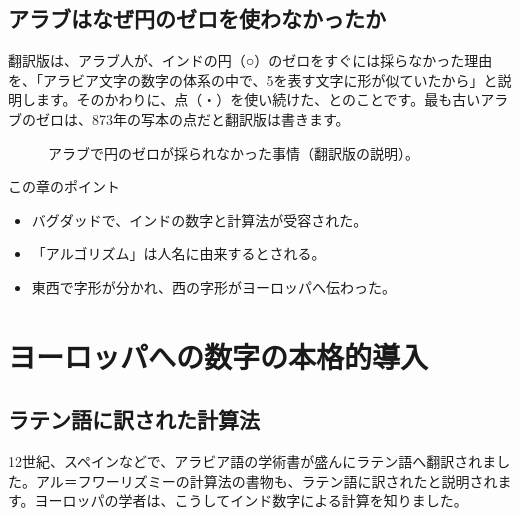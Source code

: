 \documentclass[a4paper,11pt,openany]{ltjsbook}
\begin{document}
\section{アラブはなぜ円のゼロを使わなかったか}

翻訳版は、アラブ人が、インドの円（○）のゼロをすぐには採らなかった理由を、「アラビア文字の数字の体系の中で、5を表す文字に形が似ていたから」と説明します。そのかわりに、点（・）を使い続けた、とのことです。最も古いアラブのゼロは、873年の写本の点だと翻訳版は書きます。

\begin{figure}[htbp]
\centering
{}
\caption{アラブで円のゼロが採られなかった事情（翻訳版の説明）。}
\end{figure}

\begin{pointbox}{この章のポイント}
\begin{itemize}[leftmargin=1.5em]
\item バグダッドで、インドの数字と計算法が受容された。
\item 「アルゴリズム」は人名に由来するとされる。
\item 東西で字形が分かれ、西の字形がヨーロッパへ伝わった。
\end{itemize}
\end{pointbox}

\chapter{ヨーロッパへの数字の本格的導入}

\section{ラテン語に訳された計算法}

12世紀、スペインなどで、アラビア語の学術書が盛んにラテン語へ翻訳されました。アル＝フワーリズミーの計算法の書物も、ラテン語に訳されたと説明されます。ヨーロッパの学者は、こうしてインド数字による計算を知りました。
\end{document}
